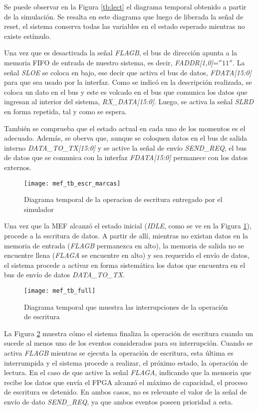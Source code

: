 Se puede observar en la Figura \ref{tb:lect} el diagrama temporal obtenido a partir de la simulación. Se resalta en este diagrama que luego de liberada la señal de reset, el sistema conserva todas las variables en el estado esperado mientras no existe estímulo.

Una vez que es desactivada la señal {\it FLAGB}, el bus de dirección apunta a la memoria FIFO de entrada de nuestro sistema, es decir, {\it FADDR[1,0]}=$''11''$. La señal {\it SLOE} se coloca en bajo, ese decir que activa el bus de datos, {\it FDATA[15:0]} para que sea usado por la interfaz. Como se indicó en la descripción realizada, se coloca un dato en el bus y este es volcado en el bus que comunica los datos que ingresan al interior del sistema, {\it RX\_DATA[15:0]}. Luego, se activa la señal {\it SLRD} en forma repetida, tal y como se espera.

También se comprueba que el estado actual en cada uno de los momentos es el adecuado. Además, se oberva que, aunque se coloquen datos en el bus de salida interno {\it DATA\_TO\_TX[15:0]} y se active la señal de envío
{\it SEND\_REQ}, el bus de datos que se comunica con la interfaz {\it FDATA[15:0]} permanece con los datos externos.

\begin{figure}[b]
	\centering
	\texttt{[image: mef\_tb\_escr\_marcas]}
	\caption{Diagrama temporal de la operacion de escritura entregado por el simulador}
	\label{tb:escr}
\end{figure}

Una vez que la MEF alcanzó el estado inicial ({\it IDLE}, como se ve en la Figura \ref{tb:escr}), procede a la escritura de datos. A partir de allí, mientras no existan datos en la memoria de entrada ({\it FLAGB} permanezca en alto), la memoria de salida no se encuentre llena ({\it FLAGA} se encuentre en alto) y sea requerido el envío de datos, el sistema procede a activar en forma sistemática los datos que encuentra en el bus de envío de datos {\it DATA\_TO\_TX}.

\begin{figure}[ht]
	\centering
	\texttt{[image: mef\_tb\_full]}
	\caption{Diagrama temporal que muestra las interrupciones de la operación de escritura}
	\label{tb:inter}
\end{figure}

La Figura \ref{tb:inter} muestra cómo el sistema finaliza la operación de escritura cuando un sucede al menos uno de los eventos considerados para su interrupción. Cuando se activa {\it FLAGB} mientras se ejecuta la operación de escritura, esta última es interrumpida y el sistema procede a realizar, el próximo estado, la operación de lectura. En el caso de que active la señal {\it FLAGA}, indicando que la memoria que recibe los datos que envía el FPGA alcanzó el máximo de capacidad, el proceso de escritura es detenido. En ambos casos, no es relevante el valor de la señal de envío de dato {\it SEND\_REQ}, ya que ambos eventos poseen prioridad a esta.
 
